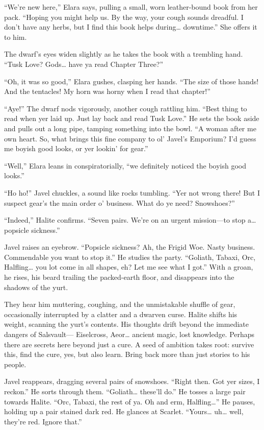 \documentclass[
  letterpaper,12pt,twoside,twocolumn,openany,
  nodeprecatedcode,bg=full]{dndbook}
\begin{document}
``We're new here,'' Elara says, pulling a small, worn leather-bound book
from her pack. ``Hoping you might help us. By the way, your cough sounds
dreadful. I don't have any herbs, but I find this book helps
during\ldots{} downtime.'' She offers it to him.

The dwarf's eyes widen slightly as he takes the book with a trembling
hand. ``Tusk Love? Gods\ldots{} have ya read Chapter Three?''

``Oh, it was so good,'' Elara gushes, clasping her hands. ``The size of
those hands! And the tentacles! My horn was horny when I read that
chapter!''

``Aye!'' The dwarf nods vigorously, another cough rattling him. ``Best
thing to read when yer laid up. Just lay back and read Tusk Love.'' He
sets the book aside and pulls out a long pipe, tamping something into
the bowl. ``A woman after me own heart. So, what brings this fine
company to ol' Javel's Emporium? I'd guess me boyish good looks, or yer
lookin' for gear.''

``Well,'' Elara leans in conspiratorially, ``we definitely noticed the
boyish good looks.''

``Ho ho!'' Javel chuckles, a sound like rocks tumbling. ``Yer not wrong
there! But I suspect gear's the main order o' business. What do ye need?
Snowshoes?''

``Indeed,'' Halite confirms. ``Seven pairs. We're on an urgent
mission---to stop a\ldots{} popsicle sickness.''

Javel raises an eyebrow. ``Popsicle sickness? Ah, the Frigid Woe. Nasty
business. Commendable you want to stop it.'' He studies the party.
``Goliath, Tabaxi, Orc, Halfling\ldots{} you lot come in all shapes, eh?
Let me see what I got.'' With a groan, he rises, his beard trailing the
packed-earth floor, and disappears into the shadows of the yurt.

They hear him muttering, coughing, and the unmistakable shuffle of gear,
occasionally interrupted by a clatter and a dwarven curse. Halite shifts
his weight, scanning the yurt's contents. His thoughts drift beyond the
immediate dangers of Salsvault--- Eiselcross, Aeor\ldots{} ancient
magic, lost knowledge. Perhaps there are secrets here beyond just a
cure. A seed of ambition takes root: survive this, find the cure, yes,
but also learn. Bring back more than just stories to his people.

Javel reappears, dragging several pairs of snowshoes. ``Right then. Got
yer sizes, I reckon.'' He sorts through them. ``Goliath\ldots{} these'll
do.'' He tosses a large pair towards Halite. ``Orc, Tabaxi, the rest of
ya. Oh and erm, Halfling\ldots{}'' He pauses, holding up a pair stained
dark red. He glances at Scarlet. ``Yours\ldots{} uh\ldots{} well,
they're red. Ignore that.''
\end{document}
